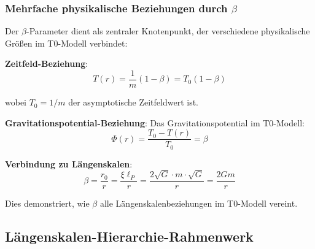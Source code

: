 \documentclass[12pt,a4paper]{article}
\begin{document}
\subsubsection{Mehrfache physikalische Beziehungen durch $\beta$}
\label{subsubsec:beta_multiple_relationships}

Der $\beta$-Parameter dient als zentraler Knotenpunkt, der verschiedene physikalische Größen im T0-Modell verbindet:

\textbf{Zeitfeld-Beziehung}:
\begin{equation}
	T(r) = \frac{1}{m}(1 - \beta) = T_0(1 - \beta)
\end{equation}

wobei $T_0 = 1/m$ der asymptotische Zeitfeldwert ist.

\textbf{Gravitationspotential-Beziehung}:
Das Gravitationspotential im T0-Modell:
\begin{equation}
	\Phi(r) = \frac{T_0 - T(r)}{T_0} = \beta
\end{equation}

\textbf{Verbindung zu Längenskalen}:
\begin{equation}
	\beta = \frac{r_0}{r} = \frac{\xi \ell_P}{r} = \frac{2\sqrt{G} \cdot m \cdot \sqrt{G}}{r} = \frac{2Gm}{r}
\end{equation}

Dies demonstriert, wie $\beta$ alle Längenskalenbeziehungen im T0-Modell vereint.

\subsection{Längenskalen-Hierarchie-Rahmenwerk}
\label{subsec:length_scale_framework}
\end{document}
